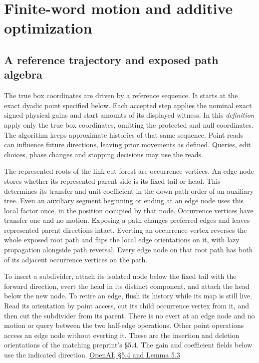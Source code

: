 \documentclass[11pt]{article}
\begin{document}
\hypertarget{finite-word-motion-and-additive-optimization}{%
\section{Finite-word motion and additive optimization}\label{finite-word-motion-and-additive-optimization}}

\hypertarget{a-reference-trajectory-and-exposed-path-algebra}{%
\subsection{A reference trajectory and exposed path algebra}\label{a-reference-trajectory-and-exposed-path-algebra}}

The true box coordinates are driven by a reference sequence. It starts at the exact dyadic point specified below. Each accepted step applies the nominal exact signed physical gains and start amounts of its displayed witness. In this \emph{definition} apply only the true box coordinates, omitting the protected and null coordinates. The algorithm keeps approximate histories of that same sequence. Point reads can influence future directions, leaving prior movements as defined. Queries, edit choices, phase changes and stopping decisions may use the reads.

The represented roots of the link-cut forest are occurrence vertices. An edge node stores whether its represented parent side is its fixed tail or head. This determines its transfer and unit coefficient in the down-path order of an auxiliary tree. Even an auxiliary segment beginning or ending at an edge node uses this local factor once, in the position occupied by that node. Occurrence vertices have transfer one and no motion. Exposing a path changes preferred edges and leaves represented parent directions intact. Everting an occurrence vertex reverses the whole exposed root path and flips the local edge orientations on it, with lazy propagation alongside path reversal. Every edge node on that root path has both of its adjacent occurrence vertices on the path.

To insert a subdivider, attach its isolated node below the fixed tail with the forward direction, evert the head in its distinct component, and attach the head below the new node. To retire an edge, flush its history while its map is still live. Read its orientation by point access, cut its child occurrence vertex from it, and then cut the subdivider from its parent. There is no evert at an edge node and no motion or query between the two half-edge operations. Other point operations access an edge node without everting it. These are the insertion and deletion orientations of the matching preprint's §5.4. The gain and coefficient fields below use the indicated direction. \href{https://raw.githubusercontent.com/openai/math/adc7f1241b42e322a6451854ab7e4b4c146bf78a/preprints/Almost-Linear-Time-Maximum-Cardinality-Matching-in-Sparse-General-Graphs-September-24-2026/main.pdf\#page=37}{OpenAI, §5.4 and Lemma 5.3}
\end{document}
